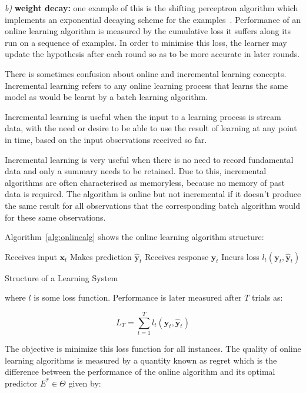 \textit{b)} \textbf{weight decay:} one example of this is the shifting
perceptron algorithm which implements an exponential decaying scheme for the
examples~\cite{cavallantietal2007}.  Performance of an online learning algorithm
is measured by the cumulative loss it suffers along its run on a sequence of
examples. In order to minimise this loss, the learner may update the hypothesis
after each round so as to be more accurate in later rounds.


There is sometimes confusion about online and incremental learning concepts.
Incremental learning refers to any online learning process that learns the same
model as would be learnt by a batch learning algorithm. 

Incremental learning is useful when the input to a learning process is stream
data, with the need or desire to be able to use the result of learning at any
point in time, based on the input observations received so far. 

Incremental learning is very useful when there is no need to record fundamental
data and only a summary needs to be retained. Due to this, incremental
algorithms are often characterised as memoryless, because no memory of past data
is required.  The algorithm is online but not incremental if it doesn't produce
the same result for all observations that the corresponding batch algorithm
would for these same observations.

Algorithm~\ref{alg:onlinealg} shows the online learning algorithm structure:

\begin{algorithm}[ht]
\begin{algorithmic}[1]
    \STATE Receives input $\mathbf{x}_t$
    \STATE Makes prediction $\mathbf{\hat{y}}_t$
    \STATE Receives response $\mathbf{y}_t$
    \STATE Incurs loss $l_t(\mathbf{y}_t,\mathbf{\hat{y}}_t)$
\end{algorithmic}
\caption{Structure of a Learning System}
\label{alg:onlinealg}
\end{algorithm}

\noindent where $l$ is some loss function. Performance is later measured after
$T$ trials as:

\begin{equation*}
L_T = \sum_{t=1}^T l_t(\mathbf{y}_t,\mathbf{\hat{y}}_t)
\end{equation*}

The objective is minimize this loss function for all instances.
The quality of online learning algorithms is measured by a quantity known as
regret which is the difference between the performance of the online algorithm
and its optimal predictor $E^* \in \Theta$ given by:

